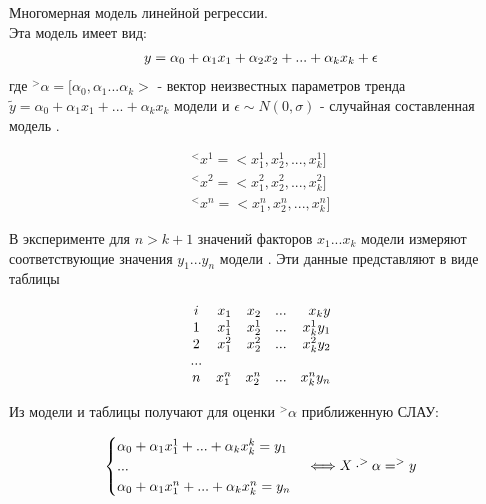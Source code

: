\documentclass[__main__.tex]{subfiles}
\begin{document}
Многомерная модель линейной регрессии.\\

Эта модель имеет вид:
\begin{gather}
    \llabel{9:1}
    y = \alpha_0+\alpha_1x_1 + \alpha_2x_2 + ... + \alpha_kx_k + \epsilon
\end{gather}
где $^>\alpha = [\alpha_0,\alpha_1...\alpha_k>$ - вектор неизвестных параметров тренда $\widetilde{y} = \alpha_0 + \alpha_1x_1+...+\alpha_kx_k$ модели  и $\epsilon \sim N(0,\sigma)$ - случайная составленная модель .

\begin{gather}
    ^<x^1 = <x_1^1,x_2^1,...,x_k^1]\\
    ^<x^2 = <x_1^2,x_2^2,...,x_k^2]\\
    ^<x^n = <x_1^n,x_2^n,...,x_k^n]
\end{gather}

В эксперименте для $n>k+1$ значений факторов $x_1...x_k$ модели  измеряют соответствующие значения $y_1...y_n$ модели . Эти данные представляют в виде таблицы

\begin{gather}
    \llabel{9:2}
    \begin{array}{crrrr}
        i & x_1   & x_2   & ... & x_ky     \\
        1 & x_1^1 & x_2^1 & ... & x_k^1y_1 \\
        2 & x_1^2 & x_2^2 & ... & x_k^2y_2 \\
        ...                                \\
        n & x_1^n & x_2^n & ... & x_k^ny_n \\
    \end{array}
\end{gather}

Из модели  и таблицы  получают для оценки $^>\alpha$ приближенную СЛАУ:

\begin{gather}
    \llabel{9:6}
    \begin{cases}
        \alpha_0+\alpha_1x_1^1+...+\alpha_kx_k^k = y_1 \\
        ...                                            \\
        \alpha_0+\alpha_1x_1^n+...+\alpha_kx_k^n = y_n \\
    \end{cases}
    \Longleftrightarrow X\cdot ^>\alpha = ^>y\\
\end{gather}
\end{document}
